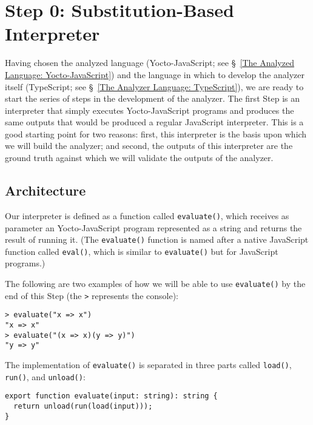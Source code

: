 \documentclass[12pt, oneside]{book}
\begin{document}
\section{Step 0: Substitution-Based Interpreter}
\label{Step 0: Substitution-Based Interpreter}

Having chosen the analyzed language (Yocto-JavaScript; see §~\ref{The Analyzed Language: Yocto-JavaScript}) and the language in which to develop the analyzer itself (TypeScript; see §~\ref{The Analyzer Language: TypeScript}), we are ready to start the series of steps in the development of the analyzer. The first Step is an interpreter that simply executes Yocto-JavaScript programs and produces the same outputs that would be produced a regular JavaScript interpreter. This is a good starting point for two reasons: first, this interpreter is the basis upon which we will build the analyzer; and second, the outputs of this interpreter are the ground truth against which we will validate the outputs of the analyzer.

\subsection{Architecture}
\label{Architecture}

Our interpreter is defined as a function called \texttt{evaluate()}, which receives as parameter an Yocto-JavaScript program represented as a string and returns the result of running it. (The \texttt{evaluate()} function is named after a native JavaScript function called \texttt{eval()}, which is similar to \texttt{evaluate()} but for JavaScript programs.)

The following are two examples of how we will be able to use \texttt{evaluate()} by the end of this Step (the \texttt{>} represents the console):

\begin{verbatim}
> evaluate("x => x")
"x => x"
> evaluate("(x => x)(y => y)")
"y => y"
\end{verbatim}

The implementation of \texttt{evaluate()} is separated in three parts called \texttt{load()}, \texttt{run()}, and \texttt{unload()}:

\begin{verbatim}
export function evaluate(input: string): string {
  return unload(run(load(input)));
}
\end{verbatim}
\end{document}
